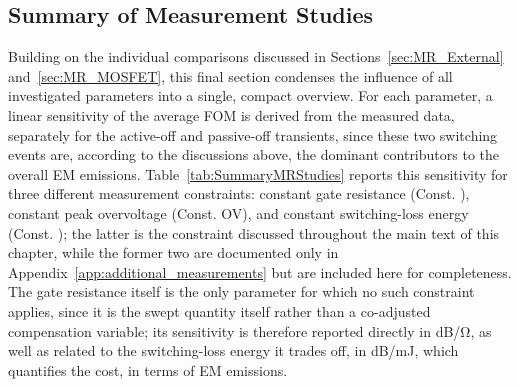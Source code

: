 \subsection{Summary of Measurement Studies}
\label{sec:MR_Summary}

Building on the individual comparisons discussed in Sections~\ref{sec:MR_External} and~\ref{sec:MR_MOSFET}, this final section condenses the influence of all investigated parameters into a single, compact overview.
For each parameter, a linear sensitivity of the average FOM is derived from the measured data, separately for the active-off and passive-off transients, since these two switching events are, according to the discussions above, the dominant contributors to the overall EM emissions.
Table~\ref{tab:SummaryMRStudies} reports this sensitivity for three different measurement constraints: constant gate resistance (Const. ), constant peak overvoltage (Const. OV), and constant switching-loss energy (Const. ); the latter is the constraint discussed throughout the main text of this chapter, while the former two are documented only in Appendix~\ref{app:additional_measurements} but are included here for completeness.
The gate resistance itself is the only parameter for which no such constraint applies, since it is the swept quantity itself rather than a co-adjusted compensation variable; its sensitivity is therefore reported directly in \si{dB/\ohm}, as well as related to the switching-loss energy it trades off, in \si{dB/mJ}, which quantifies the cost, in terms of EM emissions.

